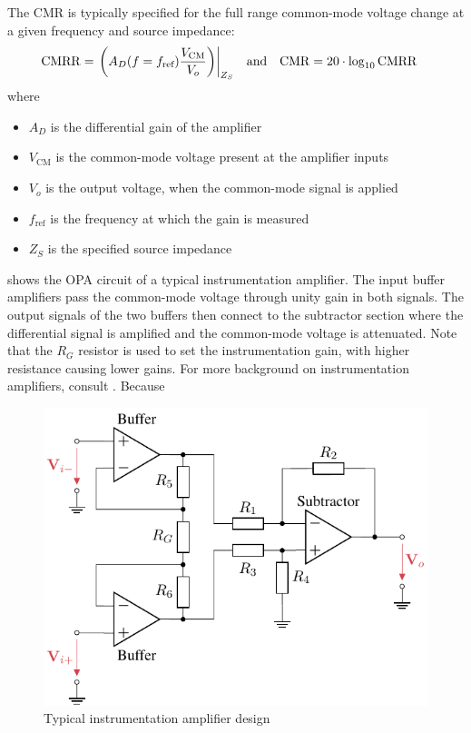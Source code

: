 The \ac{CMR} is typically specified for the full range common-mode voltage change at a given frequency and source impedance:
\begin{align}
\mathrm{CMRR} &= \eval{\pqty{A_D(f=f_{\text{ref}})\frac{V_{\mathrm{CM}}}{V_{o}}}}_{Z_S} &\text{and}& &\mathrm{CMR} &= 20\cdot\log_{10}\mathrm{CMRR}
\end{align}
where
\begin{itemize}
  \item $A_D$ is the differential gain of the amplifier
  \item $V_{\mathrm{CM}}$ is the common-mode voltage present at the amplifier inputs
  \item $V_o$ is the output voltage, when the common-mode signal is applied
  \item $f_{\text{ref}}$ is the frequency at which the gain is measured
  \item $Z_S$ is the specified source impedance
\end{itemize}

 shows the \ac{OPA} circuit of a typical instrumentation amplifier. The input buffer amplifiers pass the common-mode voltage through unity gain in both signals. The output signals of the two buffers then connect to the subtractor section where the differential signal is amplified and the common-mode voltage is attenuated. Note that the $R_G$ resistor is used to set the instrumentation gain, with higher resistance causing lower gains. For more background on instrumentation amplifiers, consult \cite{kitchin2006inst}.
Because
\begin{figure}[!htb]
  \centering
  \includegraphics[scale=0.9]{figures/electronics/op_amp/in_amp_circuit/in_amp_circuit}
  \caption[Typical Instrumentation Amplifier Design]{Typical instrumentation amplifier design%
  \label{fig:in_amp_circuit}}
\end{figure}

